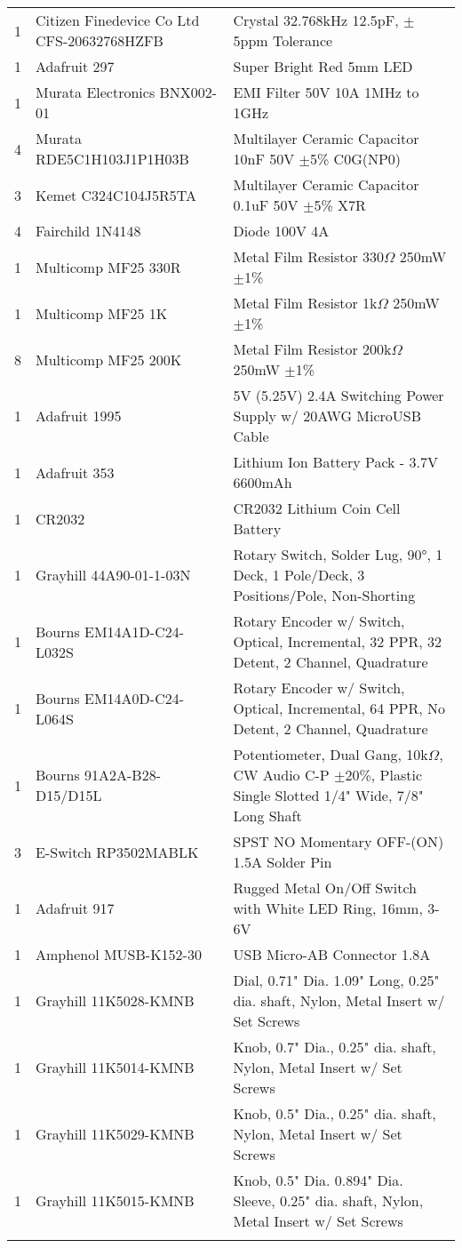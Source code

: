 \begin{longtabu}{X[1,c,m] X[6,c,m] X[9,l,m]}
  1 & Citizen Finedevice Co Ltd CFS-20632768HZFB & Crystal 32.768kHz 12.5pF, $\pm$5ppm Tolerance \\
  1 & Adafruit 297 & Super Bright Red 5mm LED \\
  1 & Murata Electronics BNX002-01 & EMI Filter 50V 10A 1MHz to 1GHz \\
  4 & Murata RDE5C1H103J1P1H03B & Multilayer Ceramic Capacitor 10nF 50V $\pm$5\% C0G(NP0) \\
  3 & Kemet C324C104J5R5TA & Multilayer Ceramic Capacitor 0.1uF 50V $\pm$5\% X7R \\
  4 & Fairchild 1N4148 & Diode 100V 4A \\
  1 & Multicomp MF25 330R & Metal Film Resistor 330$\Omega$ 250mW $\pm$1\% \\
  1 & Multicomp MF25 1K & Metal Film Resistor 1k$\Omega$ 250mW $\pm$1\% \\
  8 & Multicomp MF25 200K & Metal Film Resistor 200k$\Omega$ 250mW $\pm$1\% \\ \mrule

  1 & Adafruit 1995 & 5V (5.25V) 2.4A Switching Power Supply w/ 20AWG MicroUSB Cable \\
  1 & Adafruit 353 & Lithium Ion Battery Pack - 3.7V 6600mAh \\
  1 & CR2032 & CR2032 Lithium Coin Cell Battery \\ \mrule

  1 & Grayhill 44A90-01-1-03N & Rotary Switch, Solder Lug, 90°, 1 Deck, 1 Pole/Deck, 3 Positions/Pole, Non-Shorting \\
  1 & Bourns EM14A1D-C24-L032S & Rotary Encoder w/ Switch, Optical, Incremental, 32 PPR, 32 Detent, 2 Channel, Quadrature \\
  1 & Bourns EM14A0D-C24-L064S & Rotary Encoder w/ Switch, Optical, Incremental, 64 PPR, No Detent, 2 Channel, Quadrature \\
  1 & Bourns 91A2A-B28-D15/D15L & Potentiometer, Dual Gang, 10k$\Omega$, CW Audio C-P $\pm$20\%, Plastic Single Slotted 1/4" Wide, 7/8" Long Shaft \\
  3 & E-Switch RP3502MABLK & SPST NO Momentary OFF-(ON) 1.5A Solder Pin \\
  1 & Adafruit 917 & Rugged Metal On/Off Switch with White LED Ring, 16mm, 3-6V \\
  1 & Amphenol MUSB-K152-30 & USB Micro-AB Connector 1.8A \\ \mrule

  1 & Grayhill 11K5028-KMNB & Dial, 0.71" Dia. 1.09" Long, 0.25" dia. shaft, Nylon, Metal Insert w/ Set Screws \\
  1 & Grayhill 11K5014-KMNB & Knob, 0.7" Dia., 0.25" dia. shaft, Nylon, Metal Insert w/ Set Screws \\
  1 & Grayhill 11K5029-KMNB & Knob, 0.5" Dia., 0.25" dia. shaft, Nylon, Metal Insert w/ Set Screws \\
  1 & Grayhill 11K5015-KMNB & Knob, 0.5" Dia. 0.894" Dia. Sleeve, 0.25" dia. shaft, Nylon, Metal Insert w/ Set Screws \\ \mrule


\end{longtabu}
